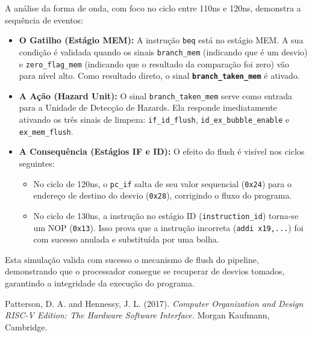 \documentclass[12pt, a4paper]{article}
\begin{document}
A análise da forma de onda, com foco no ciclo entre 110ns e 120ns, demonstra a sequência de eventos:
\begin{itemize}
    \item \textbf{O Gatilho (Estágio MEM):} A instrução \texttt{beq} está no estágio MEM. A sua condição é validada quando os sinais \texttt{branch\_mem} (indicando que é um desvio) e \texttt{zero\_flag\_mem} (indicando que o resultado da comparação foi zero) vão para nível alto. Como resultado direto, o sinal \textbf{\texttt{branch\_taken\_mem}} é ativado.

    \item \textbf{A Ação (Hazard Unit):} O sinal \texttt{branch\_taken\_mem} serve como entrada para a Unidade de Detecção de Hazards. Ela responde imediatamente ativando os três sinais de limpeza: \texttt{if\_id\_flush}, \texttt{id\_ex\_bubble\_enable} e \texttt{ex\_mem\_flush}.

    \item \textbf{A Consequência (Estágios IF e ID):} O efeito do flush é visível nos ciclos seguintes:
    \begin{itemize}
        \item No ciclo de 120ns, o \texttt{pc\_if} salta de seu valor sequencial (\texttt{0x24}) para o endereço de destino do desvio (\texttt{0x28}), corrigindo o fluxo do programa.
        \item No ciclo de 130ns, a instrução no estágio ID (\texttt{instruction\_id}) torna-se um NOP (\texttt{0x13}). Isso prova que a instrução incorreta (\texttt{addi x19,...}) foi com sucesso anulada e substituída por uma bolha.
    \end{itemize}
\end{itemize}

Esta simulação valida com sucesso o mecanismo de flush do pipeline, demonstrando que o processador consegue se recuperar de desvios tomados, garantindo a integridade da execução do programa.

\begin{thebibliography}{9}

Patterson, D. A. and Hennessy, J. L. (2017). \textit{Computer Organization and Design RISC-V Edition: The Hardware Software Interface.} Morgan Kaufmann, Cambridge.

\end{thebibliography}
\end{document}
